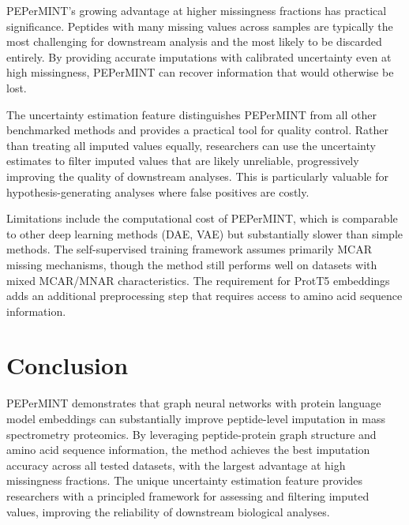 \documentclass[12pt]{article}
\begin{document}
PEPerMINT's growing advantage at higher missingness fractions has practical significance. Peptides with many missing values across samples are typically the most challenging for downstream analysis and the most likely to be discarded entirely. By providing accurate imputations with calibrated uncertainty even at high missingness, PEPerMINT can recover information that would otherwise be lost.

The uncertainty estimation feature distinguishes PEPerMINT from all other benchmarked methods and provides a practical tool for quality control. Rather than treating all imputed values equally, researchers can use the uncertainty estimates to filter imputed values that are likely unreliable, progressively improving the quality of downstream analyses. This is particularly valuable for hypothesis-generating analyses where false positives are costly.

Limitations include the computational cost of PEPerMINT, which is comparable to other deep learning methods (DAE, VAE) but substantially slower than simple methods. The self-supervised training framework assumes primarily MCAR missing mechanisms, though the method still performs well on datasets with mixed MCAR/MNAR characteristics. The requirement for ProtT5 embeddings adds an additional preprocessing step that requires access to amino acid sequence information.

\section{Conclusion}

PEPerMINT demonstrates that graph neural networks with protein language model embeddings can substantially improve peptide-level imputation in mass spectrometry proteomics. By leveraging peptide-protein graph structure and amino acid sequence information, the method achieves the best imputation accuracy across all tested datasets, with the largest advantage at high missingness fractions. The unique uncertainty estimation feature provides researchers with a principled framework for assessing and filtering imputed values, improving the reliability of downstream biological analyses.



\end{document}
